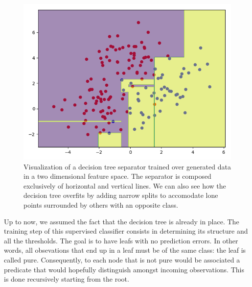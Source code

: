                 \begin{figure}[htbp]
                    \centering
                    \includegraphics[width=.5\textwidth]{images/related_work/decision_tree_separator}
                    \caption[
                        Visualization of a decision tree separator trained over generated data in a two dimensional feature space.
                    ]{
                        \label{fig::decision_tree_separator}
                        Visualization of a decision tree separator trained over generated data in a two dimensional feature space.
                        The separator is composed exclusively of horizontal and vertical lines.
                        We can also see how the decision tree overfits by adding narrow splits to accomodate lone points surrounded by others with an opposite class.
                    }
                \end{figure}

                Up to now, we assumed the fact that the decision tree is already in place.
                The training step of this supervised classifier consists in determining its structure and all the thresholds.
                The goal is to have leafs with no prediction errors.
                In other words, all obsevations that end up in a leaf must be of the same class: the leaf is called pure.
                Consequently, to each node that is not pure would be associated a predicate that would hopefully distinguish amongst incoming observations.
                This is done recursively starting from the root.\\

